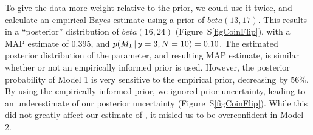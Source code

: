 To give the data more weight relative to the prior, we could use it twice, and
calculate an empirical Bayes estimate using a prior of $beta(13,17)$.  This
results in a ``posterior'' distribution of $beta(16, 24)$
(Figure~S\ref{figCoinFlip}), with a MAP estimate of 0.395, and $p(M_1 \,|\,
y=3, N=10) = 0.10$.
The estimated posterior distribution of the parameter, and resulting MAP
estimate, is similar whether or not an empirically informed prior is used.
However, the posterior probability of Model 1 is very sensitive to the
empirical prior, decreasing by 56\%.
By using the empirically informed prior, we ignored prior uncertainty, leading
to an underestimate of our posterior uncertainty (Figure~S\ref{figCoinFlip}).
While this did not greatly affect our estimate of \myTheta{}, it misled us
to be overconfident in Model 2.




